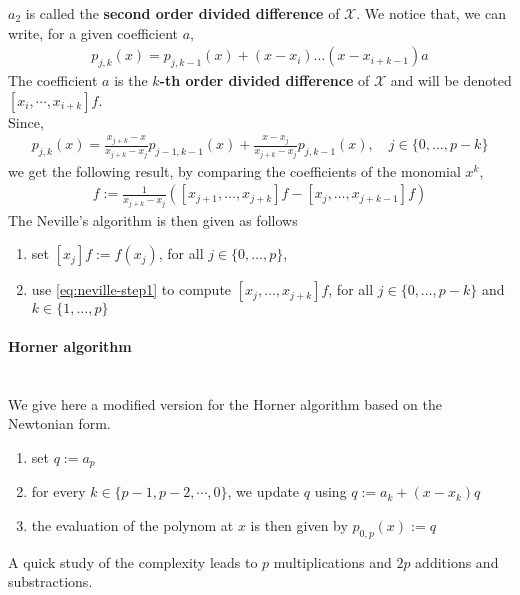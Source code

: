 $a_2$ is called the \textbf{second order divided difference} of $\mathcal{X}$.
\noindent
We notice that, we can write, for a given coefficient $a$, 
\begin{align*}
  p_{j,k}(x) = p_{j,k-1}(x) + (x-x_i) \ldots (x-x_{i+k-1}) a 
\end{align*}
The coefficient $a$ is the \textbf{$k$-th order divided difference} of $\mathcal{X}$ and will be denoted $[x_i, \cdots, x_{i+k}]f$.
\\
\noindent
Since, 
\begin{align*}
  p_{j,k}(x) = \frac{x_{j+k}-x}{x_{j+k}-x_j} p_{j-1, k-1}(x) + \frac{x-x_{j}}{x_{j+k}-x_j} p_{j, k-1}(x), \quad j \in \{ 0, \ldots, p-k \}
\end{align*}
we get the following result, by comparing the coefficients of the monomial $x^k$,
\begin{align}
  [x_j, \ldots, x_{j+k}] f := \frac{1}{x_{j+k}-x_j} \left( [x_{j+1}, \ldots, x_{j+k}] f - [x_j, \ldots, x_{j+k-1}] f \right)  
  \label{eq:neville-step1}
\end{align}
The Neville's algorithm is then given as follows
\begin{enumerate}
  \item set $[x_j]f := f(x_j)$, for all $j \in \{ 0, \ldots, p \}$, 
  \item use \ref{eq:neville-step1} to compute $[x_j, \ldots, x_{j+k}] f$, for all  $j \in \{ 0, \ldots, p-k \}$ and $k \in \{ 1, \ldots, p \}$ 
\end{enumerate}

\paragraph{Horner algorithm} \mbox{}\\
We give here a modified version for the Horner algorithm based on the Newtonian form. 
\begin{enumerate}
  \item set $q := a_p$ 
  \item for every $k \in \{ p-1, p-2, \cdots, 0 \}$, we update $q$ using $q := a_k + (x-x_k)q$ 
  \item the evaluation of the polynom at $x$ is then given by $p_{0,p}(x) := q$ 
\end{enumerate}
A quick study of the complexity leads to $p$ multiplications and $2p$ additions and substractions.

